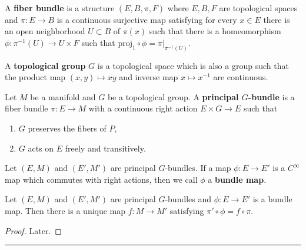 \begin{defn} A \textbf{fiber bundle} is a structure $(E,B,\pi,F)$ where $E,B,F$ are topological spaces and $\pi:E\rightarrow B$ is a continuous surjective map satisfying for every $x\in E$ there is an open neighborhood $U\subset B$ of $\pi(x)$ such that there is a homeomorphism $\phi:\pi^{-1}(U)\rightarrow U\times F$ such that $\textrm{proj}_1\circ\phi=\pi|_{\pi^{-1}(U)}$.
\end{defn}

\begin{defn} A \textbf{topological group} $G$ is a topological space which is also a group such that the product map $(x,y)\mapsto xy$ and inverse map $x\mapsto x^{-1}$ are continuous.
\end{defn}

\begin{defn} Let $M$ be a manifold and $G$ be a topological group. A \textbf{principal $G$-bundle} is a fiber bundle $\pi:E\rightarrow M$ with a continuous right action $E\times G\rightarrow E$ such that
\begin{enumerate}
\item $G$ preserves the fibers of $P$,
\item $G$ acts on $E$ freely and transitively.
\end{enumerate}
\end{defn}

\begin{defn} Let $(E,M)$ and $(E',M')$ are principal $G$-bundles. If a map $\phi:E\rightarrow E'$ is a $C^\infty$ map which commutes with right actions, then we call $\phi$ a \textbf{bundle map}.
\end{defn}

\begin{prop} Let $(E,M)$ and $(E',M')$ are principal $G$-bundles and $\phi:E\rightarrow E'$ is a bundle map. Then there is a unique map $f:M\rightarrow M'$ satisfying $\pi'\circ\phi=f\circ \pi$.
\end{prop}
\begin{proof}
Later.
\end{proof}


\noindent\rule{\textwidth}{1pt}
\newline